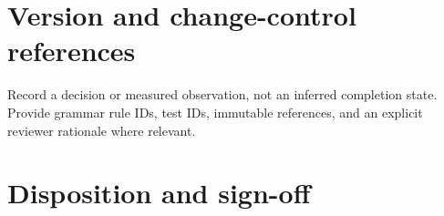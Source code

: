 \documentclass[11pt,letterpaper]{article}
\begin{document}
\section{Version and change-control references}
Record a decision or measured observation, not an inferred completion state. Provide grammar rule IDs, test IDs, immutable references, and an explicit reviewer rationale where relevant.
\section{Disposition and sign-off}
\end{document}
